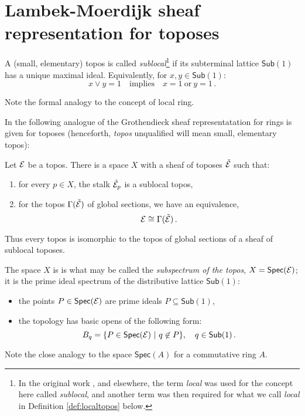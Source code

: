 \documentclass[lambek.tex]{subfiles}
\begin{document}
\section{Lambek-Moerdijk sheaf representation for toposes}

\begin{definition} A  (small, elementary)  topos is called \emph{sublocal}\footnote{
In the original work \cite{LM}, and elsewhere, the term \emph{local} was used for the concept here called \emph{sublocal}, and another term was then required for what we call \emph{local} in Definition \ref{def:localtopos} below.
} 
if its subterminal lattice $\mathsf{Sub}(1)$ has a unique maximal ideal.
Equivalently, for $x,y\in \mathsf{Sub}(1)$: 
\[
x\vee y = 1\quad\text{implies}\quad x=1\ \text{or}\ y=1\,.
\]
\end{definition}
%
Note the formal analogy to the concept of local ring.

In \cite{LM} the following analogue of the Grothendieck sheaf representatation for rings is given for toposes (henceforth, \emph{topos} unqualified will mean small, elementary topos):
\begin{theorem}
Let $\mathcal{E}$ be a topos.  There is a space $X$ with a sheaf of toposes $\tilde{\mathcal{E}}$ such that:
\begin{enumerate}
\item for every $p\in X$, the stalk $\tilde{\mathcal{E}}_p$ is a sublocal topos, 
\item for the topos $\Gamma(\tilde{\mathcal{E}})$ of global sections, we have an equivalence, $$\mathcal{E}\cong \Gamma(\tilde{\mathcal{E}})\,.$$
\end{enumerate}
Thus every topos is isomorphic to the topos of global sections of a sheaf of sublocal toposes.
\end{theorem}


The space $X$ is is what may be called the \emph{subspectrum of the topos},  $X=\mathsf{Spec}(\mathcal{E})$;   
it is the prime ideal spectrum of the distributive lattice $\mathsf{Sub}(1)$:
\begin{itemize}
\item the points $P\in \mathsf{Spec}(\mathcal{E})$ are prime ideals $P\subseteq \mathsf{Sub}(1)$,
\item the topology has basic opens of the following form:
$$B_q = \{ P\in \mathsf{Spec}(\mathcal{E})\ |\ q\not\in P \}, \quad q\in\mathsf{Sub}(1)\,.$$
\end{itemize}
%
Note the close analogy to the space $\mathsf{Spec}(A)$ for a commutative ring $A$.
\end{document}
